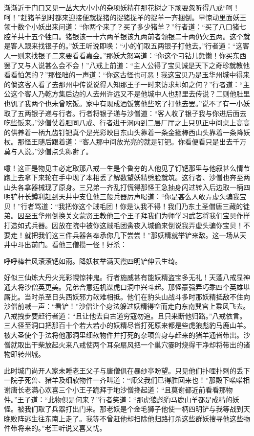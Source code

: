 \documentclass[12pt,UTF8]{ctexbook}
\begin{document}
{	渐渐近于门口又见一丛大大小小的杂项妖精在那花树之下顽耍忽听得八戒“呵！呵！”赶猪羊到时都来迎接便就捉猪的捉猪捉羊的捉羊一齐捆倒。早惊动里面妖王领十数个小妖出来问道：“你两个来了？买了多少猪羊？”行者道：“买了八口猪七腔羊共十五个牲口。猪银该一十六两羊银该九两前者领银二十两仍欠五两。这个就是客人跟来找银子的。”妖王听说即唤：“小的们取五两银子打他去。”行者道：“这客人一则来找银子二来要看看嘉会。”那妖大怒骂道：“你这个刁钻儿惫懒！你买东西罢了又与人说甚么会不会！”八戒上前道：“主人公得了宝贝诚是天下之奇珍就教他看看怕怎的？”那怪咄的一声道：“你这古怪也可恶！我这宝贝乃是玉华州城中得来的倘这客人看了去那州中传说说得人知那王子一时来访求却如之何？”行者道：“主公这个客人乃乾方集后边的人去州许远又不是他城中人也那里去传说？二则他肚里也饥了我两个也未曾吃饭。家中有现成酒饭赏他些吃了打他去罢。”说不了有一小妖取了五两银子递与行者。行者将银子递与沙僧道：“客人收了银子我与你进后面去吃些饭来。”沙僧仗着胆同八戒、行者进于洞内到二层厂厅之上只见正中间桌上高高的供养着一柄九齿钉钯真个是光彩映目东山头靠着一条金箍棒西山头靠着一条降妖杖。那怪王随后跟着道：“客人那中间放光亮的就是钉钯。你看便看只是出去千万莫与人说。”沙僧点头称谢了。
	
	噫！这正是物见主必定取那八戒一生是个鲁夯的人他见了钉钯那里与他叙甚么情节跑上去拿下来轮在手中现了本相丢了解数望妖精劈脸就筑。这行者、沙僧也奔至两山头各拿器械现了原身。三兄弟一齐乱打慌得那怪王急抽身闪过转入后边取一柄四明铲杆长鐏利赶到天井中支住他三般兵器厉声喝道：“你是甚么人敢弄虚头骗我宝贝！”行者骂道：“我把你这个贼毛团！你是认我不得！我们乃东土圣僧唐三藏的徒弟。因至玉华州倒换关文蒙贤王教他三个王子拜我们为师学习武艺将我们宝贝作样打造如式兵器。因放在院中被你这贼毛团夤夜入城偷来倒说我弄虚头骗你宝贝！不要走！就把我们这三件兵器各奉承你几下尝尝！”那妖精就举铲来敌。这一场从天井中斗出前门。看他三僧攒一怪！好杀：
	
	呼呼棒若风滚滚钯如雨。降妖杖举满天霞四明铲伸云生绮。
	
	好似三仙炼大丹火光彩幌惊神鬼。行者施威甚有能妖精盗宝多无礼！天蓬八戒显神通大将沙僧英更美。兄弟合意运机谋虎口洞中兴斗起。那怪豪强弄巧乖四个英雄堪厮比。当时杀至日头西妖邪力软难相抵。他们在豹头山战斗多时那妖精抵敌不住向沙僧前喊一声：“看铲！”沙僧让个身法躲过妖精得空而走向东南巽宫上乘风飞去。八戒拽步要赶行者道：“且让他去自古道穷寇勿追。且只来断他归路。”八戒依言。三人径至洞口把那百十个若大若小的妖精尽皆打死原来都是些虎狼彪豹马鹿山羊。被大圣使个手法将他那洞里细软物件并打死的杂项兽身与赶来的猪羊通皆带出。沙僧就取出干柴放起火来八戒使两个耳朵扇风把一个巢穴霎时烧得干净却将带出的诸物即转州城。
	
	此时城门尚开人家未睡老王父子与唐僧俱在暴纱亭盼望。只见他们扑哩扑剌的丢下一院子死兽、猪羊及细软物件一齐叫道：“师父我们已得胜回来也！”那殿下喏喏相谢唐长老满心欢喜三个小王子跪拜于地沙僧搀起道：“且莫谢都近前看看那物件。”王子道：“此物俱是何来？”行者笑道：“那虎狼彪豹马鹿山羊都是成精的妖怪。被我们取了兵器打出门来。那老妖是个金毛狮子他使一柄四明铲与我等战到天晚败阵逃生往东南上走了。我等不曾赶他却扫除他归路打杀这些群妖搜寻他这些物件带将来的。”老王听说又喜又忧。
	
}
\end{document}
